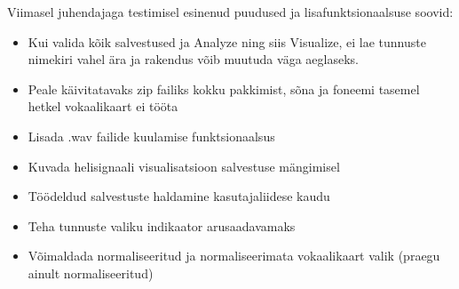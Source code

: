 Viimasel juhendajaga testimisel esinenud puudused ja lisafunktsionaalsuse soovid:
\begin{itemize}
    \item Kui valida kõik salvestused ja Analyze ning siis Visualize, ei lae tunnuste nimekiri vahel ära ja rakendus võib muutuda väga aeglaseks.
    \item Peale käivitatavaks zip failiks kokku pakkimist, sõna ja foneemi tasemel hetkel vokaalikaart ei tööta
    \item Lisada .wav failide kuulamise funktsionaalsus
    \item Kuvada helisignaali visualisatsioon salvestuse mängimisel
    \item Töödeldud salvestuste haldamine kasutajaliidese kaudu
    \item Teha tunnuste valiku indikaator arusaadavamaks
    \item Võimaldada normaliseeritud ja normaliseerimata vokaalikaart valik (praegu ainult normaliseeritud)
\end{itemize}
